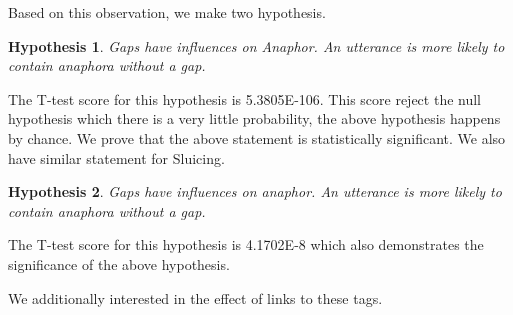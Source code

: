 \documentclass[bsc,frontabs,twoside,singlespacing,parskip,deptreport]{infthesis}     %
\newtheorem{hypo}{Hypothesis}[chapter]
\begin{document}
Based on this observation, we make two hypothesis.

\begin{hypo}
Gaps have influences on Anaphor. An utterance is more likely to contain anaphora without a gap. 
\end{hypo}

The T-test score for this hypothesis is 5.3805E-106. This score reject the null hypothesis which there is a very little probability, the above hypothesis happens by chance. We prove that the above statement is statistically significant. We also have similar statement for Sluicing.

\begin{hypo}
Gaps have influences on anaphor. An utterance is more likely to contain anaphora without a gap. 
\end{hypo}

The T-test score for this hypothesis is 4.1702E-8 which also demonstrates the significance of the above hypothesis.

We additionally interested in the effect of links to these tags. 
\end{document}
